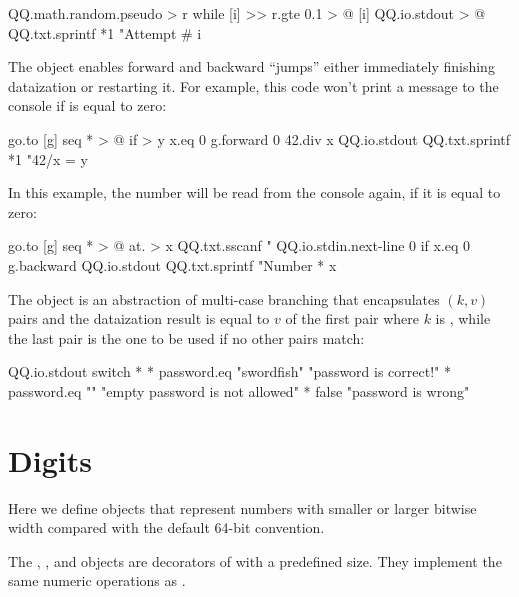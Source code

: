 \documentclass[sigplan,nonacm]{acmart}
\newcommand\deff[1]{\ff{\textcolor{blue!50!black}{\textbf{#1}}}}
\begin{document}
\begin{ffcode}
QQ.math.random.pseudo > r
while
  [i] >>
    r.gte 0.1 > @
  [i]
    QQ.io.stdout > @
      QQ.txt.sprintf *1
        "Attempt #%
        i
\end{ffcode}

The \deff{go} object enables forward and backward ``jumps'' either immediately finishing dataization or restarting it.
For example, this code won't print a message to the console if  is equal to zero:

\begin{ffcode}
go.to
  [g]
    seq * > @
      if > y
        x.eq 0
        g.forward 0
        42.div x
      QQ.io.stdout
        QQ.txt.sprintf *1
          "42/x = %
          y
\end{ffcode}

In this example, the number will be read from the console again, if it is equal to zero:

\begin{ffcode}
go.to
  [g]
    seq * > @
      at. > x
        QQ.txt.sscanf
          "%
          QQ.io.stdin.next-line
        0
      if
        x.eq 0
        g.backward
        QQ.io.stdout
          QQ.txt.sprintf
            "Number %
            * x
\end{ffcode}

The \deff{switch} object is an abstraction of multi-case branching that encapsulates \((k, v)\) pairs and the 
dataization result is equal to \(v\) of the first pair where \(k\) is , while the last pair is the one 
to be used if no other pairs match:

\begin{ffcode}
QQ.io.stdout
  switch *
    *
      password.eq "swordfish"
      "password is correct!"
    *
      password.eq ""
      "empty password is not allowed"
    *
      false
      "password is wrong"
\end{ffcode}

\section{Digits}\label{sec:digits}

Here we define objects that represent numbers with smaller or larger bitwise width compared with the default 64-bit convention.

The \deff{i16}, \deff{i32}, and \deff{i64} objects are decorators of  with a predefined size.
They implement the same numeric operations as .
\end{document}
